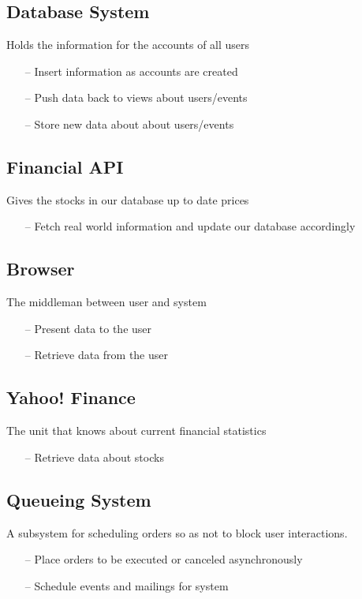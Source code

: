 \subsection{Database System}
Holds the information for the accounts of all users
\begin{itemize}
\item[--] Insert information as accounts are created
\item[--] Push data back to views about users/events
\item[--] Store new data about about users/events
\end{itemize}

\subsection{Financial API}
Gives the stocks in our database up to date prices
\begin{itemize}
\item[--] Fetch real world information and update our database accordingly
\end{itemize}

\subsection{Browser}
The middleman between user and system
\begin{itemize}
\item[--] Present data to the user
\item[--] Retrieve data from the user
\end{itemize}

\subsection{Yahoo! Finance}
The unit that knows about current financial statistics
\begin{itemize}
\item[--] Retrieve data about stocks
\end{itemize}

\subsection{Queueing System}
A subsystem for scheduling orders so as not to block user
interactions.
\begin{itemize}
\item[--] Place orders to be executed or canceled asynchronously
\item[--] Schedule events and mailings for system
\end{itemize}
